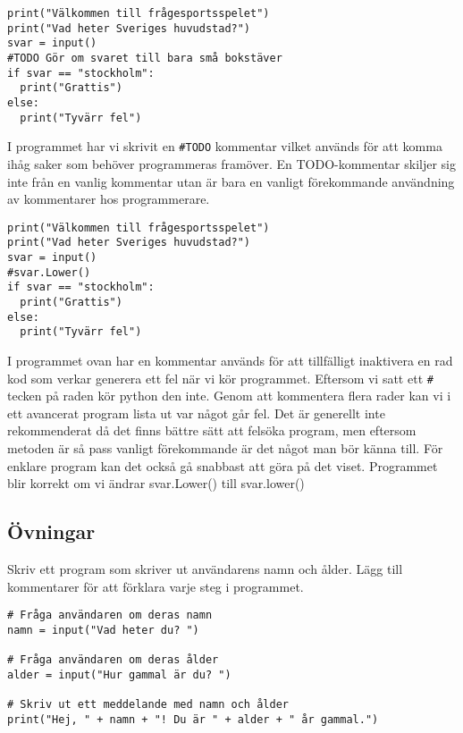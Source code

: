 \begin{lstlisting}[title=ToDo]
print("Välkommen till frågesportsspelet")
print("Vad heter Sveriges huvudstad?")
svar = input()
#TODO Gör om svaret till bara små bokstäver
if svar == "stockholm":
  print("Grattis")
else:
  print("Tyvärr fel")
\end{lstlisting}

I programmet har vi skrivit en \texttt{\#TODO} kommentar vilket används för att komma ihåg saker som behöver programmeras framöver.
En TODO-kommentar skiljer sig inte från en vanlig kommentar utan är bara en vanligt förekommande användning av kommentarer hos programmerare.

\begin{lstlisting}[title=Felsökning genom kodkommentarer]
print("Välkommen till frågesportsspelet")
print("Vad heter Sveriges huvudstad?")
svar = input()
#svar.Lower()
if svar == "stockholm":
  print("Grattis")
else:
  print("Tyvärr fel")
\end{lstlisting}

I programmet ovan har en kommentar används för att tillfälligt inaktivera en rad kod som verkar generera ett fel när vi kör programmet. 
Eftersom vi satt ett \texttt{\#} tecken på raden kör python den inte.
Genom att kommentera flera rader kan vi i ett avancerat program lista ut var något går fel. 
Det är generellt inte rekommenderat då det finns bättre sätt att felsöka program, men eftersom metoden 
är så pass vanligt förekommande är det något man bör känna till. 
För enklare program kan det också gå snabbast att göra på det viset.
Programmet blir korrekt om vi ändrar svar.Lower() till svar.lower()

\subsection{Övningar}
\begin{exercise}
Skriv ett program som skriver ut användarens namn och ålder. Lägg till kommentarer för att förklara varje steg i programmet.
\end{exercise}
\begin{solution}
\begin{lstlisting}
# Fråga användaren om deras namn
namn = input("Vad heter du? ")

# Fråga användaren om deras ålder
alder = input("Hur gammal är du? ")

# Skriv ut ett meddelande med namn och ålder
print("Hej, " + namn + "! Du är " + alder + " år gammal.")
\end{lstlisting}
\end{solution}

